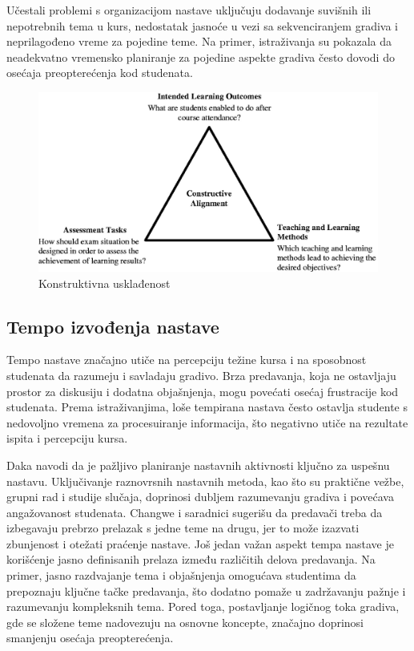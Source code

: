 \documentclass[a4paper]{article}
\begin{document}
Učestali problemi s organizacijom nastave uključuju dodavanje suvišnih ili nepotrebnih
tema u kurs, nedostatak jasnoće u vezi sa sekvenciranjem gradiva i neprilagođeno
vreme za pojedine teme. Na primer, istraživanja su pokazala da neadekvatno vremensko
planiranje za pojedine aspekte gradiva često dovodi do osećaja preopterećenja kod
studenata.

\begin{figure}[h!]
\begin{center}
\includegraphics[scale=2]{constructive_alignment.jpeg}
\end{center}
\caption{Konstruktivna usklađenost}
\label{fig:konstruktivna_uskladjenost}
\end{figure}

\subsection{Tempo izvođenja nastave}
Tempo nastave značajno utiče na percepciju težine kursa i na sposobnost studenata da
razumeju i savladaju gradivo. Brza predavanja, koja ne ostavljaju prostor za diskusiju i
dodatna objašnjenja, mogu povećati osećaj frustracije kod studenata. Prema istraživanjima,
loše tempirana nastava često ostavlja studente s nedovoljno vremena za procesuiranje
informacija, što negativno utiče na rezultate ispita i percepciju kursa.

Daka \cite{daka2020exploration} navodi da je pažljivo planiranje nastavnih aktivnosti ključno za uspešnu
nastavu. Uključivanje raznovrsnih nastavnih metoda, kao što su praktične vežbe, grupni rad i
studije slučaja, doprinosi dubljem razumevanju gradiva i povećava angažovanost studenata.
Changwe i saradnici \cite{daka2020exploration} sugerišu da predavači treba da izbegavaju prebrzo prelazak s
jedne teme na drugu, jer to može izazvati zbunjenost i otežati praćenje nastave.
Još jedan važan aspekt tempa nastave je korišćenje jasno definisanih prelaza između
različitih delova predavanja. Na primer, jasno razdvajanje tema i objašnjenja omogućava
studentima da prepoznaju ključne tačke predavanja, što dodatno pomaže u zadržavanju
pažnje i razumevanju kompleksnih tema. Pored toga, postavljanje logičnog toka gradiva, gde
se složene teme nadovezuju na osnovne koncepte, značajno doprinosi smanjenju osećaja
preopterećenja.
\end{document}
